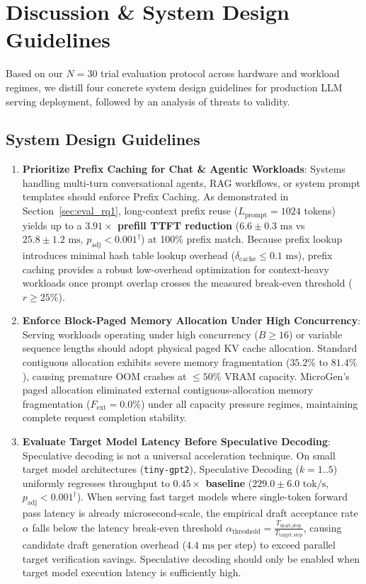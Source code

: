 \section{Discussion \& System Design Guidelines}
\label{sec:discussion}

Based on our $N=30$ trial evaluation protocol across hardware and workload regimes, we distill four concrete system design guidelines for production LLM serving deployment, followed by an analysis of threats to validity.

\subsection{System Design Guidelines}
\label{sec:disc_guidelines}

\begin{enumerate}
    \item \textbf{Prioritize Prefix Caching for Chat \& Agentic Workloads}: Systems handling multi-turn conversational agents, RAG workflows, or system prompt templates should enforce Prefix Caching. As demonstrated in Section~\ref{sec:eval_rq1}, long-context prefix reuse ($L_{\text{prompt}}=1024$ tokens) yields up to a \textbf{$3.91\times$ prefill TTFT reduction} ($6.6 \pm 0.3\text{ ms}$ vs $25.8 \pm 1.2\text{ ms}$, $p_{\text{adj}} < 0.001^\dagger$) at 100\% prefix match. Because prefix lookup introduces minimal hash table lookup overhead ($\delta_{\text{cache}} \le 0.1\text{ ms}$), prefix caching provides a robust low-overhead optimization for context-heavy workloads once prompt overlap crosses the measured break-even threshold ($r \ge 25\%$).

    \item \textbf{Enforce Block-Paged Memory Allocation Under High Concurrency}: Serving workloads operating under high concurrency ($B \ge 16$) or variable sequence lengths should adopt physical paged KV cache allocation. Standard contiguous allocation exhibits severe memory fragmentation ($35.2\%$ to $81.4\%$), causing premature \textsf{OOM} crashes at $\le 50\%$ VRAM capacity. \textsf{MicroGen}'s paged allocation eliminated external contiguous-allocation memory fragmentation ($F_{\text{ext}} = 0.0\%$) under all capacity pressure regimes, maintaining complete request completion stability.

    \item \textbf{Evaluate Target Model Latency Before Speculative Decoding}: Speculative decoding is not a universal acceleration technique. On small target model architectures (\texttt{tiny-gpt2}), Speculative Decoding ($k=1..5$) uniformly regresses throughput to \textbf{$0.45\times$ baseline} ($229.0 \pm 6.0\text{ tok/s}$, $p_{\text{adj}} < 0.001^\dagger$). When serving fast target models where single-token forward pass latency is already microsecond-scale, the empirical draft acceptance rate $\alpha$ falls below the latency break-even threshold $\alpha_{\text{threshold}} = \frac{T_{\text{draft\_step}}}{T_{\text{target\_step}}}$, causing candidate draft generation overhead ($4.4\text{ ms}$ per step) to exceed parallel target verification savings. Speculative decoding should only be enabled when target model execution latency is sufficiently high.


\end{enumerate}

